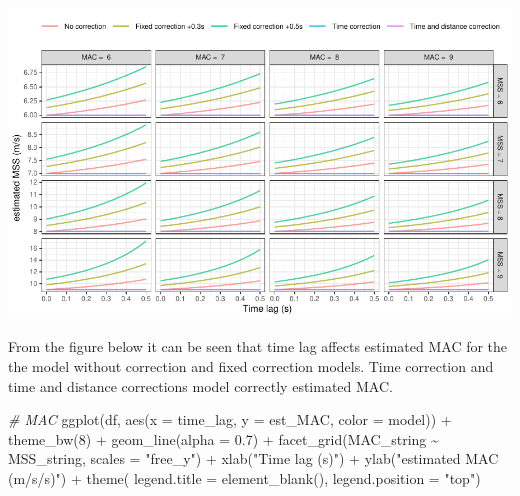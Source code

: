 \documentclass[fleqn,10pt,lineno]{wlpeerj} %
\newenvironment{Shaded}{\begin{snugshade}}{\end{snugshade}}
\newcommand{\AttributeTok}[1]{\textcolor[rgb]{0.77,0.63,0.00}{#1}}
\newcommand{\CommentTok}[1]{\textcolor[rgb]{0.56,0.35,0.01}{\textit{#1}}}
\newcommand{\DecValTok}[1]{\textcolor[rgb]{0.00,0.00,0.81}{#1}}
\newcommand{\FloatTok}[1]{\textcolor[rgb]{0.00,0.00,0.81}{#1}}
\newcommand{\FunctionTok}[1]{\textcolor[rgb]{0.00,0.00,0.00}{#1}}
\newcommand{\NormalTok}[1]{#1}
\newcommand{\SpecialCharTok}[1]{\textcolor[rgb]{0.00,0.00,0.00}{#1}}
\newcommand{\StringTok}[1]{\textcolor[rgb]{0.31,0.60,0.02}{#1}}
\begin{document}
\begin{center}\includegraphics[width=1\linewidth]{paper_files/figure-latex/unnamed-chunk-50-1} \end{center}

From the figure below it can be seen that time lag affects estimated MAC for the the model without correction and fixed correction models. Time correction and time and distance corrections model correctly estimated MAC.

\begin{Shaded}
\begin{Highlighting}[]
\CommentTok{\# MAC}
\FunctionTok{ggplot}\NormalTok{(df, }\FunctionTok{aes}\NormalTok{(}\AttributeTok{x =}\NormalTok{ time\_lag, }\AttributeTok{y =}\NormalTok{ est\_MAC, }\AttributeTok{color =}\NormalTok{ model)) }\SpecialCharTok{+}
  \FunctionTok{theme\_bw}\NormalTok{(}\DecValTok{8}\NormalTok{) }\SpecialCharTok{+}
  \FunctionTok{geom\_line}\NormalTok{(}\AttributeTok{alpha =} \FloatTok{0.7}\NormalTok{) }\SpecialCharTok{+}
  \FunctionTok{facet\_grid}\NormalTok{(MAC\_string }\SpecialCharTok{\textasciitilde{}}\NormalTok{ MSS\_string, }\AttributeTok{scales =} \StringTok{"free\_y"}\NormalTok{) }\SpecialCharTok{+}
  \FunctionTok{xlab}\NormalTok{(}\StringTok{"Time lag (s)"}\NormalTok{) }\SpecialCharTok{+}
  \FunctionTok{ylab}\NormalTok{(}\StringTok{"estimated MAC (m/s/s)"}\NormalTok{) }\SpecialCharTok{+}
  \FunctionTok{theme}\NormalTok{(}
    \AttributeTok{legend.title =} \FunctionTok{element\_blank}\NormalTok{(),}
    \AttributeTok{legend.position =} \StringTok{"top"}\NormalTok{)}
\end{Highlighting}
\end{Shaded}
\end{document}
